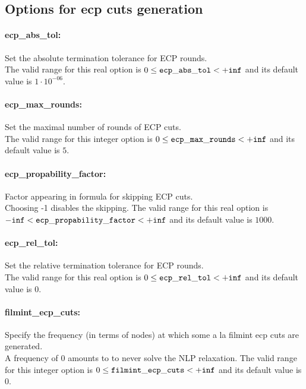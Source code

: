 \subsection{Options for ecp cuts generation}
\label{sec:Options_for_ecp_cuts_generation}
\paragraph{ecp\_abs\_tol:} Set the absolute termination tolerance for ECP rounds. $\;$ \\
 The valid range for this real option is 
$0 \le {\tt ecp\_abs\_tol } <  {\tt +inf}$
and its default value is $1 \cdot 10^{-06}$.


\paragraph{ecp\_max\_rounds:} Set the maximal number of rounds of ECP cuts. $\;$ \\
 The valid range for this integer option is
$0 \le {\tt ecp\_max\_rounds } <  {\tt +inf}$
and its default value is $5$.


\paragraph{ecp\_propability\_factor:} Factor appearing in formula for skipping ECP cuts. $\;$ \\
 Choosing -1 disables the skipping. The valid range for this real option is 
${\tt -inf} <  {\tt ecp\_propability\_factor } <  {\tt +inf}$
and its default value is $1000$.


\paragraph{ecp\_rel\_tol:} Set the relative termination tolerance for ECP rounds. $\;$ \\
 The valid range for this real option is 
$0 \le {\tt ecp\_rel\_tol } <  {\tt +inf}$
and its default value is $0$.


\paragraph{filmint\_ecp\_cuts:} Specify the frequency (in terms of nodes) at which some a la filmint ecp cuts are generated. $\;$ \\
 A frequency of 0 amounts to to never solve the
NLP relaxation. The valid range for this integer option is
$0 \le {\tt filmint\_ecp\_cuts } <  {\tt +inf}$
and its default value is $0$.


